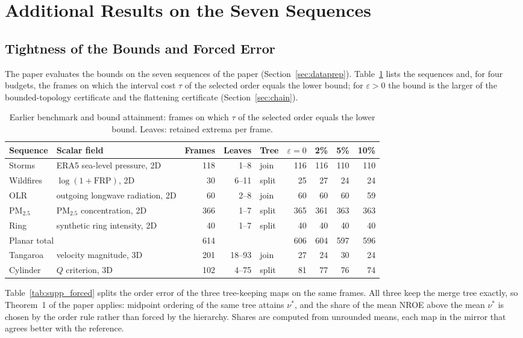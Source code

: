 \documentclass[preprint]{vgtc}   %
\begin{document}
\FloatBarrier
\section{Additional Results on the Seven Sequences}\label{sec:results}
\subsection{Tightness of the Bounds and Forced Error}\label{sec:supp_bounds}
The paper evaluates the bounds on the seven sequences of the paper (Section~\ref{sec:dataprep}). Table~\ref{tab:supp_bounds} lists the sequences and, for four budgets, the frames on which the interval cost $\tau$ of the selected order equals the lower bound; for $\varepsilon>0$ the bound is the larger of the bounded-topology certificate and the flattening certificate (Section~\ref{sec:chain}).

\begin{table}[t]
\centering\small
\caption{Earlier benchmark and bound attainment: frames on which $\tau$ of the selected order equals the lower bound. Leaves: retained extrema per frame.}\label{tab:supp_bounds}
\begin{tabular}{llrrlrrrr}\toprule
Sequence & Scalar field & Frames & Leaves & Tree & $\varepsilon=0$ & 2\% & 5\% & 10\%\\\midrule
Storms & ERA5 sea-level pressure, 2D & 118 & 1--8 & join & 116 & 116 & 110 & 110\\
Wildfires & $\log(1+\mathrm{FRP})$, 2D & 30 & 6--11 & split & 25 & 27 & 24 & 24\\
OLR & outgoing longwave radiation, 2D & 60 & 2--8 & join & 60 & 60 & 60 & 59\\
PM$_{2.5}$ & PM$_{2.5}$ concentration, 2D & 366 & 1--7 & split & 365 & 361 & 363 & 363\\
Ring & synthetic ring intensity, 2D & 40 & 1--7 & split & 40 & 40 & 40 & 40\\\midrule
\multicolumn{2}{l}{Planar total} & 614 & & & 606 & 604 & 597 & 596\\\midrule
Tangaroa & velocity magnitude, 3D & 201 & 18--93 & join & 27 & 24 & 30 & 24\\
Cylinder & $Q$ criterion, 3D & 102 & 4--75 & split & 81 & 77 & 76 & 74\\\bottomrule
\end{tabular}
\end{table}

Table~\ref{tab:supp_forced} splits the order error of the three tree-keeping maps on the same frames. All three keep the merge tree exactly, so Theorem~1 of the paper applies: midpoint ordering of the same tree attains $\nu^*$, and the share of the mean NROE above the mean $\nu^*$ is chosen by the order rule rather than forced by the hierarchy. Shares are computed from unrounded means, each map in the mirror that agrees better with the reference.
\end{document}
